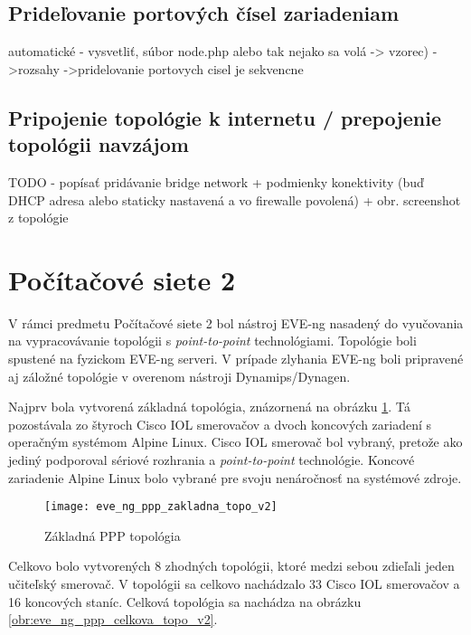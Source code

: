 \subsection{Prideľovanie portových čísel zariadeniam}
    automatické - vysvetliť, súbor node.php alebo tak nejako sa volá -> vzorec)
    ->rozsahy
    ->pridelovanie portovych cisel je sekvencne




\subsection{Pripojenie topológie k internetu / prepojenie topológii navzájom}

{\huge TODO - popísať pridávanie bridge network + podmienky konektivity (buď DHCP adresa alebo staticky nastavená a vo firewalle povolená) + obr. screenshot z topológie}






\section{Počítačové siete 2}

V rámci predmetu Počítačové siete 2 bol nástroj EVE-ng nasadený do vyučovania na vypracovávanie topológii s \emph{point-to-point} technológiami. Topológie boli spustené na fyzickom EVE-ng serveri. V prípade zlyhania EVE-ng boli pripravené aj záložné topológie v overenom nástroji Dynamips/Dynagen.

Najprv bola vytvorená základná topológia, znázornená na obrázku \ref{obr:eve_ng_ppp_zakladna_topo_v2}. Tá pozostávala zo štyroch Cisco IOL smerovačov a dvoch koncových zariadení s operačným systémom Alpine Linux. Cisco IOL smerovač bol vybraný, pretože ako jediný podporoval sériové rozhrania a \emph{point-to-point} technológie. Koncové zariadenie Alpine Linux bolo vybrané pre svoju nenáročnosť na systémové zdroje.

\begin{figure}
    \centering
    \texttt{[image: eve\_ng\_ppp\_zakladna\_topo\_v2]}
    \caption{Základná PPP topológia}
    \label{obr:eve_ng_ppp_zakladna_topo_v2}
\end{figure}

Celkovo bolo vytvorených 8 zhodných topológii, ktoré medzi sebou zdieľali jeden učiteľský smerovač. V topológii sa celkovo nachádzalo 33 Cisco IOL smerovačov a 16 koncových staníc. Celková topológia sa nachádza na obrázku \ref{obr:eve_ng_ppp_celkova_topo_v2}.

